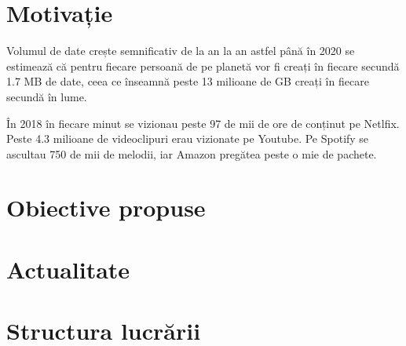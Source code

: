 \section{Motivație}

Volumul de date crește semnificativ de la an la an astfel până în 2020 se estimează că pentru fiecare persoană de pe planetă vor fi creați în fiecare secundă 1.7 MB de date, ceea ce înseamnă peste 13 milioane de GB creați în fiecare secundă în lume.

În 2018 în fiecare minut se vizionau peste 97 de mii de ore de conținut pe Netlfix. Peste 4.3 milioane de videoclipuri erau vizionate pe Youtube. Pe Spotify se ascultau 750 de mii de melodii, iar Amazon pregătea peste o mie de pachete.

\section{Obiective propuse}


\section{Actualitate}


\section{Structura lucrării}